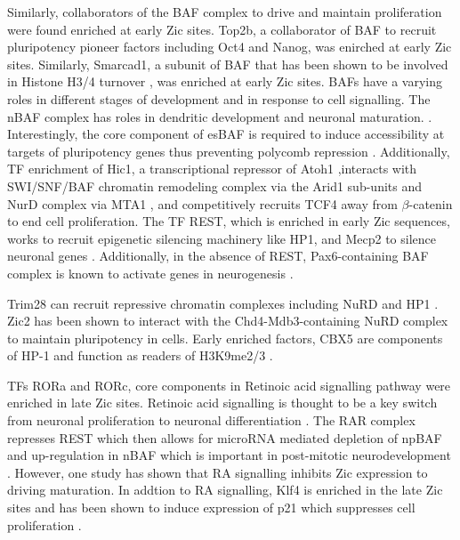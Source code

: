 \documentclass[fleqn,10pt,twocolumn]{wlscirep}
\begin{document}
Similarly, collaborators of the BAF complex to drive and maintain proliferation were found enriched at early Zic sites. Top2b, a collaborator of BAF to recruit pluripotency pioneer factors including Oct4 and Nanog, was enirched at early Zic sites. Similarly,  Smarcad1, a subunit of BAF that has been shown to be involved in Histone H3/4 turnover \cite{Markert2021Smarcad1Activity}, was  enriched at early Zic sites. BAFs have a varying roles in different stages of development and in response to cell signalling. The nBAF complex has roles in dendritic development and neuronal maturation. \cite{Alfert2019TheDisease}. Interestingly, the core component of esBAF is required to induce accessibility at targets of pluripotency genes thus preventing polycomb repression \cite{Ho2011EsBAFFunction}.  Additionally, TF enrichment of Hic1, a transcriptional repressor of Atoh1 \cite{Briggs2008CooperationMedulloblastoma },interacts with SWI/SNF/BAF chromatin remodeling complex via the Arid1 sub-units and NurD complex via MTA1 \cite{VanRechem2009HIC1ARID1A/BAF250A, VanRechem2010DifferentialCells}, and competitively recruits TCF4 away from $\beta$-catenin \cite{Valenta2006HIC1bodies} to end cell proliferation. The TF REST, which is enriched in early Zic sequences, works to recruit epigenetic silencing machinery like HP1, and Mecp2 to silence neuronal genes \cite{Ballas2005TheGenes}. Additionally, in the absence of REST, Pax6-containing BAF complex is known to activate genes in neurogenesis \cite{Ninkovic2013TheNetwork, Tuoc2013ChromatinThickness}. 


Trim28 can recruit repressive chromatin complexes including NuRD and HP1 \cite{Sripathy2006TheRepression}. Zic2 has been shown to interact with the Chd4-Mdb3-containing NuRD complex to maintain pluripotency in cells\cite{Luo2015Zic2Specification}. Early enriched factors, CBX5 are components of HP-1 and function as readers of H3K9me2/3 \cite{vanWijnen2021BiologicalDevelopment}. 

TFs RORa and RORc, core components in Retinoic acid signalling pathway were enriched in late Zic sites. Retinoic acid signalling is thought to be a key switch from neuronal proliferation to neuronal differentiation \cite{Janesick2015RertinoicDifferentiation}. The RAR complex represses REST which then allows for microRNA mediated depletion of npBAF and up-regulation in nBAF which is important in post-mitotic neurodevelopment \cite{Alfert2019TheDisease}. However, one study has shown that RA signalling inhibits Zic expression \cite{Janesic2013ErfNeurogenisis} to driving maturation. In addtion to RA signalling, Klf4 is enriched in the late Zic sites and has been shown to induce expression of p21 which suppresses cell proliferation \cite{Zhang2000ThePromoter}. 
\end{document}
